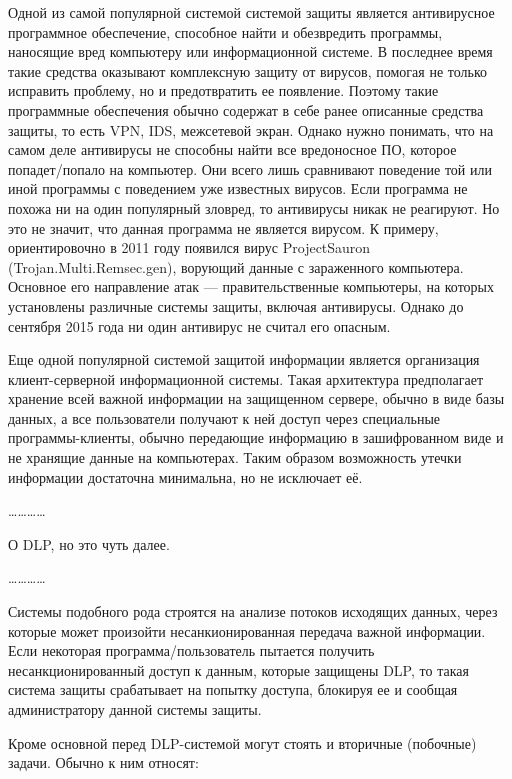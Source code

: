 Одной из самой популярной системой системой защиты является антивирусное программное обеспечение, способное найти и обезвредить программы, наносящие вред компьютеру или информационной системе. В последнее время такие средства оказывают комплексную защиту от вирусов, помогая не только исправить проблему, но и предотвратить ее появление. Поэтому такие программные обеспечения обычно содержат в себе ранее описанные средства защиты, то есть VPN, IDS, межсетевой экран. Однако нужно понимать, что на самом деле антивирусы не способны найти все вредоносное ПО, которое попадет/попало на компьютер. Они всего лишь сравнивают поведение той или иной программы с поведением уже известных вирусов. Если программа не похожа ни на один популярный зловред, то антивирусы никак не реагируют. Но это не значит, что данная программа не является вирусом. К примеру, ориентировочно в 2011 году появился вирус ProjectSauron (Trojan.Multi.Remsec.gen), ворующий данные с зараженного компьютера. Основное его направление атак --- правительственные компьютеры, на которых установлены различные системы защиты, включая антивирусы. Однако до сентября 2015 года ни один антивирус не считал его опасным.

Еще одной популярной системой защитой информации является организация клиент-серверной информационной системы. Такая архитектура предполагает хранение всей важной информации на защищенном сервере, обычно в виде базы данных, а все пользователи получают к ней доступ через специальные программы-клиенты, обычно передающие информацию в зашифрованном виде и не хранящие данные на компьютерах. Таким образом возможность утечки информации достаточна минимальна, но не исключает её.


\dots\dots\dots\dots

О DLP, но это чуть далее.

\dots\dots\dots\dots

Системы подобного рода строятся на анализе потоков исходящих данных, через которые может произойти несанкионированная передача важной информации. Если некоторая программа/пользователь пытается получить несанкционированный доступ к данным, которые защищены DLP, то такая система защиты срабатывает на попытку доступа, блокируя ее и сообщая администратору данной системы защиты.

Кроме основной перед DLP-системой могут стоять и вторичные (побочные) задачи. Обычно к ним относят:

